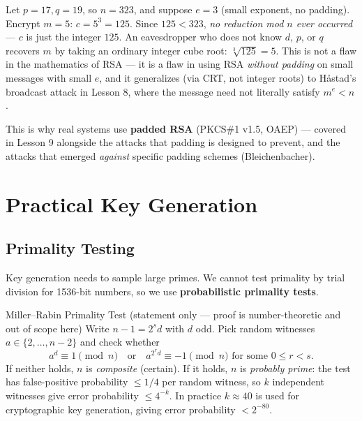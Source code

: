 \begin{example}
Let $p=17, q=19$, so $n = 323$, and suppose $e=3$ (small exponent, no padding). Encrypt $m=5$: $c = 5^3 = 125$. Since $125 < 323$, \emph{no reduction mod $n$ ever occurred} — $c$ is just the integer $125$. An eavesdropper who does not know $d$, $p$, or $q$ recovers $m$ by taking an ordinary integer cube root: $\sqrt[3]{125} = 5$. This is not a flaw in the mathematics of RSA — it is a flaw in using RSA \emph{without padding} on small messages with small $e$, and it generalizes (via CRT, not integer roots) to Håstad's broadcast attack in Lesson 8, where the message need not literally satisfy $m^e < n$.
\end{example}

This is why real systems use \textbf{padded RSA} (PKCS\#1 v1.5, OAEP) — covered in Lesson 9 alongside the attacks that padding is designed to prevent, and the attacks that emerged \emph{against} specific padding schemes (Bleichenbacher).

\newpage
\section{Practical Key Generation}

\subsection{Primality Testing}

Key generation needs to sample large primes. We cannot test primality by trial division for 1536-bit numbers, so we use \textbf{probabilistic primality tests}.

\begin{keybox}{Miller--Rabin Primality Test (statement only — proof is number-theoretic and out of scope here)}
Write $n - 1 = 2^{s} d$ with $d$ odd. Pick random witnesses $a \in \{2, \dots, n-2\}$ and check whether
\[
a^{d} \equiv 1 \pmod n \quad \text{or} \quad a^{2^{r} d} \equiv -1 \pmod n \text{ for some } 0 \le r < s.
\]
If neither holds, $n$ is \emph{composite} (certain). If it holds, $n$ is \emph{probably prime}: the test has false-positive probability $\le 1/4$ per random witness, so $k$ independent witnesses give error probability $\le 4^{-k}$. In practice $k \approx 40$ is used for cryptographic key generation, giving error probability $< 2^{-80}$.
\end{keybox}

